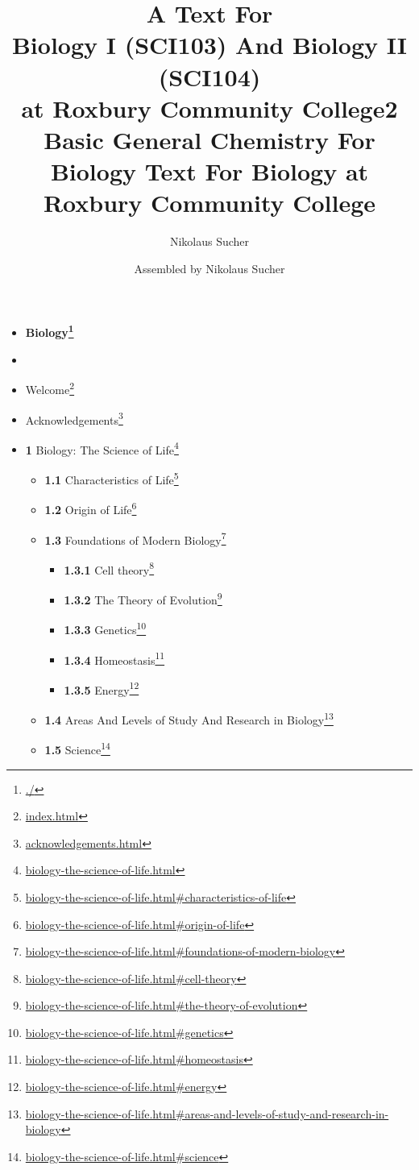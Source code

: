 \documentclass[
]{article}
\title{A Text For 
  \\Biology I (SCI103) And Biology II (SCI104)
  \\ at Roxbury Community College}
\author{Nikolaus Sucher}
\date{}
\title{2 Basic General Chemistry For Biology \textbar{} Text For Biology
at Roxbury Community College}
\author{Assembled by Nikolaus Sucher}
\date{}
\providecommand{\tightlist}{%
  \setlength{\itemsep}{0pt}\setlength{\parskip}{0pt}}
\providecommand{\tightlist}{%
  \setlength{\itemsep}{0pt}\setlength{\parskip}{0pt}}
\let\rmarkdownfootnote\footnote%
\def\footnote{\protect\rmarkdownfootnote}
\renewcommand{\href}[2]{#2\footnote{\url{#1}}}
\theoremstyle{definition}
\theoremstyle{definition}
\theoremstyle{definition}
\theoremstyle{remark}
\begin{document}
\maketitle

\begin{itemize}
\tightlist
\item
  \textbf{\href{./}{Biology}}
\item
\item
  \href{index.html}{\emph{}Welcome}
\item
  \href{acknowledgements.html}{\emph{}Acknowledgements}
\item
  \href{biology-the-science-of-life.html}{\emph{}\textbf{1} Biology: The
  Science of Life}

  \begin{itemize}
  \tightlist
  \item
    \href{biology-the-science-of-life.html\#characteristics-of-life}{\emph{}\textbf{1.1}
    Characteristics of Life}
  \item
    \href{biology-the-science-of-life.html\#origin-of-life}{\emph{}\textbf{1.2}
    Origin of Life}
  \item
    \href{biology-the-science-of-life.html\#foundations-of-modern-biology}{\emph{}\textbf{1.3}
    Foundations of Modern Biology}

    \begin{itemize}
    \tightlist
    \item
      \href{biology-the-science-of-life.html\#cell-theory}{\emph{}\textbf{1.3.1}
      Cell theory}
    \item
      \href{biology-the-science-of-life.html\#the-theory-of-evolution}{\emph{}\textbf{1.3.2}
      The Theory of Evolution}
    \item
      \href{biology-the-science-of-life.html\#genetics}{\emph{}\textbf{1.3.3}
      Genetics}
    \item
      \href{biology-the-science-of-life.html\#homeostasis}{\emph{}\textbf{1.3.4}
      Homeostasis}
    \item
      \href{biology-the-science-of-life.html\#energy}{\emph{}\textbf{1.3.5}
      Energy}
    \end{itemize}
  \item
    \href{biology-the-science-of-life.html\#areas-and-levels-of-study-and-research-in-biology}{\emph{}\textbf{1.4}
    Areas And Levels of Study And Research in Biology}
  \item
    \href{biology-the-science-of-life.html\#science}{\emph{}\textbf{1.5}
    Science}


\end{itemize}
\end{itemize}
\end{document}

